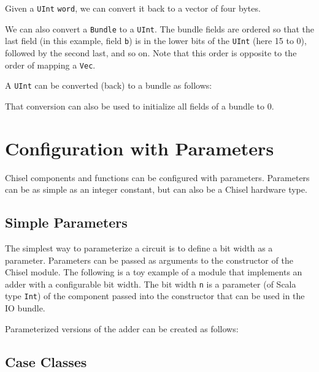 \documentclass[%
    10pt,
    headinclude, footinclude=false,
    openright, %
    notitlepage,
    cleardoublepage=empty,
    headsepline,
    numbers=noenddot,
    bibliography=totoc, index=totoc,
    ]{scrbook}
\newcommand{\code}[1]{{\lstinline[basicstyle=\small\ttfamily]{#1}}}
\begin{document}

\noindent Given a \code{UInt} \code{word}, we can convert it back to a vector
of four bytes.


We can also convert a \code{Bundle} to a \code{UInt}. The bundle fields are ordered
so that the last field (in this example, field \code{b}) is in the lower bits of the \code{UInt}
(here 15 to 0), followed by the second last, and so on. Note that this order is opposite to
the order of mapping a \code{Vec}.


\noindent A \code{UInt} can be converted (back) to a bundle as follows:


\noindent That conversion can also be used to initialize all fields of a bundle to 0.



\section{Configuration with Parameters}

Chisel components and functions can be configured with parameters.
Parameters can be as simple as an integer constant, but can also be a Chisel
hardware type.

\subsection{Simple Parameters}

The simplest way to parameterize a circuit is to define a bit width as a parameter.
Parameters can be passed as arguments to
the constructor of the Chisel module. The following is a toy example of
a module that implements an adder with a configurable bit width.
The bit width \code{n} is a parameter (of Scala type \code{Int}) of the component
passed into the constructor that can be used in the IO bundle.


\noindent Parameterized versions of the adder can be created as follows:


\subsection{Case Classes}
\end{document}
